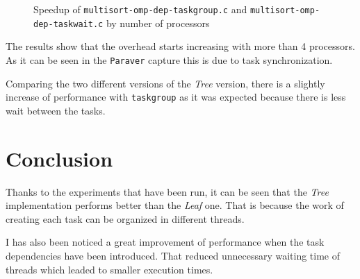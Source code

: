 \documentclass[a4paper]{article}
\newenvironment{questionenum}{%
\setlist[enumerate]{resume}
\restartlist{enumerate}
\newcommand{\question}[1]{
\begin{enumerate}
	\item\bfseries ##1
\end{enumerate}
}}{%
}
\begin{document}
\begin{questionenum}
    \begin{figure}[H]
        \centering
        \caption{Speedup of \texttt{multisort-omp-dep-taskgroup.c} and \texttt{multisort-omp-dep-taskwait.c} by number of processors}
        \label{fig:dep}
    \end{figure}
    
    The results show that the overhead starts increasing with more than 4 processors. As it can be seen in the \verb|Paraver| capture this is due to task synchronization.
    
    Comparing the two different versions of the \emph{Tree} version, there is a slightly increase of performance with \verb|taskgroup| as it was expected because there is less wait between the tasks.
\end{questionenum}

\section{Conclusion}
Thanks to the experiments that have been run, it can be seen that the \emph{Tree} implementation performs better than the \emph{Leaf} one. That is because the work of creating each task can be organized in different threads.

I has also been noticed a great improvement of performance when the task dependencies have been introduced. That reduced unnecessary waiting time of threads which leaded to smaller execution times.
\end{document}
